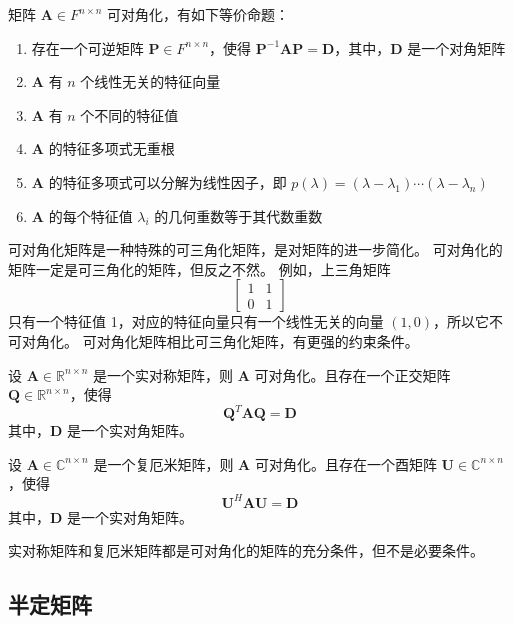 \begin{corollary}[矩阵可对角化的充要条件]
    矩阵 $\mathbf{A}\in F^{n\times n}$ 可对角化，有如下等价命题：
    \begin{enumerate}
        \item 存在一个可逆矩阵 $\mathbf{P} \in F^{n \times n}$，使得 $\mathbf{P}^{-1}\mathbf{A}\mathbf{P} = \mathbf{D}$，其中，$\mathbf{D}$ 是一个对角矩阵
        \item $\mathbf{A}$ 有 $n$ 个线性无关的特征向量
        \item $\mathbf{A}$ 有 $n$ 个不同的特征值
        \item $\mathbf{A}$ 的特征多项式无重根
        \item $\mathbf{A}$ 的特征多项式可以分解为线性因子，即 $p(\lambda) = (\lambda - \lambda_1) \cdots (\lambda - \lambda_n)$
        \item $\mathbf{A}$ 的每个特征值 $\lambda_i$ 的几何重数等于其代数重数
    \end{enumerate}
\end{corollary}

\begin{note}
    可对角化矩阵是一种特殊的可三角化矩阵，是对矩阵的进一步简化。
    可对角化的矩阵一定是可三角化的矩阵，但反之不然。
    例如，上三角矩阵
    \[\begin{bmatrix}
        1 & 1 \\
        0 & 1
    \end{bmatrix}\] 
    只有一个特征值 1，对应的特征向量只有一个线性无关的向量 $(1,0)$，所以它不可对角化。
    可对角化矩阵相比可三角化矩阵，有更强的约束条件。
\end{note}
\vspace{1em}

\begin{proposition}[实对称矩阵是可对角化的矩阵]
    设 $\mathbf{A} \in \mathbb{R}^{n \times n}$ 是一个实对称矩阵，则 $\mathbf{A}$ 可对角化。且存在一个正交矩阵 $\mathbf{Q} \in \mathbb{R}^{n \times n}$，使得
    \[
        \mathbf{Q}^T \mathbf{A} \mathbf{Q} = \mathbf{D}
    \]
    其中，$\mathbf{D}$ 是一个实对角矩阵。
    \label{prop:real_symmetric_matrix_diagonalizable}
\end{proposition}

\begin{proposition}[复厄米矩阵是可对角化的矩阵]
    设 $\mathbf{A} \in \mathbb{C}^{n \times n}$ 是一个复厄米矩阵，则 $\mathbf{A}$ 可对角化。且存在一个酉矩阵 $\mathbf{U} \in \mathbb{C}^{n \times n}$，使得
    \[
        \mathbf{U}^H \mathbf{A} \mathbf{U} = \mathbf{D}
    \]
    其中，$\mathbf{D}$ 是一个实对角矩阵。
    \label{prop:hermitian_matrix_diagonalizable}
\end{proposition}

\begin{note}
    实对称矩阵和复厄米矩阵都是可对角化的矩阵的充分条件，但不是必要条件。    
\end{note}
\vspace{1em}

\subsection{半定矩阵}

\newpage